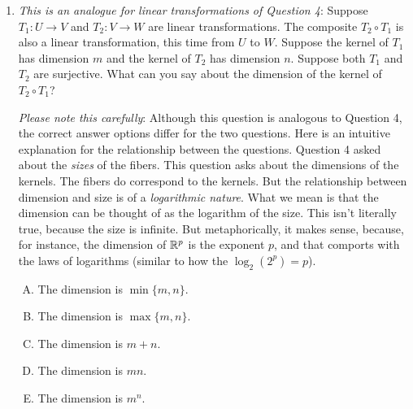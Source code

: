 \documentclass[10pt]{amsart}
\begin{document}
\begin{enumerate}
  {\em Performance review}: 18 out of 27 got this. 5 chose (D), 2
  chose (A), 1 each chose (B) and (C).

  \vspace{0.3in}

  For the coming questions, we will denote vector spaces by letters
  such as $U$, $V$, and $W$. You can, however, consider them to be
  finite-dimensional vector spaces of the form $\R^n$. However, you
  should take care not to use a letter for the dimension of a vector
  space if the letter is already in use elsewhere in the
  question. Also, you should take care to use different letters for
  the dimensions of different vector spaces, unless it is given to you
  that the vector spaces have the same dimension. The results also
  hold for infinite-dimensional vector spaces, but you can work on all
  the problems assuming you are working in the finite-dimensional
  setting.

\item {\em This is an analogue for linear transformations of Question
  4}: Suppose $T_1: U \to V$ and $T_2:V \to W$ are linear
  transformations. The composite $T_2 \circ T_1$ is also a linear
  transformation, this time from $U$ to $W$. Suppose the kernel of
  $T_1$ has dimension $m$ and the kernel of $T_2$ has dimension
  $n$. Suppose both $T_1$ and $T_2$ are surjective. What can you say
  about the dimension of the kernel of $T_2 \circ T_1$?

  {\em Please note this carefully}: Although this question is
  analogous to Question 4, the correct answer options differ for the
  two questions. Here is an intuitive explanation for the relationship
  between the questions. Question 4 asked about the {\em sizes} of the
  fibers. This question asks about the dimensions of the kernels. The
  fibers do correspond to the kernels. But the relationship between
  dimension and size is of a {\em logarithmic nature}. What we mean is
  that the dimension can be thought of as the logarithm of the
  size. This isn't literally true, because the size is infinite. But
  metaphorically, it makes sense, because, for instance, the dimension
  of $\mathbb{R}^p$ is the exponent $p$, and that comports with the laws of
  logarithms (similar to how the $\log_2(2^p) = p$).

  \begin{enumerate}[(A)]
  \item The dimension is $\min \{ m,n \}$.
  \item The dimension is $\max \{ m,n \}$.
  \item The dimension is $m + n$.
  \item The dimension is $mn$.
  \item The dimension is $m^n$.
  \end{enumerate}


\end{enumerate}
\end{document}
